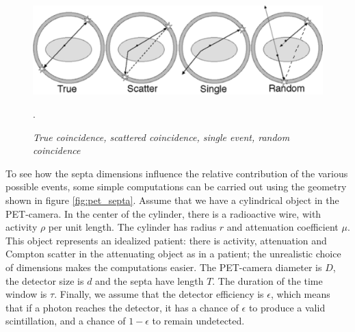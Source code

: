 \begin{figure}[tb]
\centering
\includegraphics[width=\figbig]{figs/fig_pet_random_enzo.pdf}
\caption{\label{fig:pet_random_enzo} \emph{True coincidence, scattered
coincidence, single event, random coincidence}}.
\end{figure}

To see how the septa dimensions influence the relative contribution of the
various possible events, some simple computations can be carried out using the
geometry shown in figure \ref{fig:pet_septa}. Assume that we have a
cylindrical object in the PET-camera. In the center of the cylinder, there is
a radioactive wire, with activity $\rho$ per unit length. The cylinder has
radius $r$ and attenuation coefficient $\mu$. This object represents an
idealized patient: there is activity, attenuation and Compton scatter in the
attenuating object as in a patient; the unrealistic choice of dimensions makes
the computations easier. The PET-camera diameter is $D$, the detector size is
$d$ and the septa have length $T$. The duration of the time window is
$\tau$. Finally, we assume that the detector efficiency is $\epsilon$, which
means that if a photon reaches the detector, it has a chance of $\epsilon$ to
produce a valid scintillation, and a chance of $1 - \epsilon$ to remain
undetected.\\[2mm]

